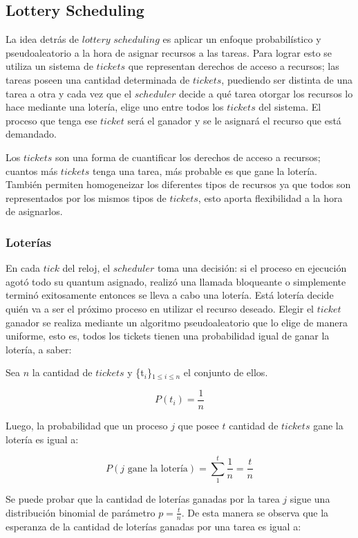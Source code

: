 \subsection{Lottery Scheduling}

La idea detr\'as de $lottery$ $scheduling$\cite{SchedLottery} es aplicar un enfoque probabil\'istico y pseudoaleatorio a la hora de asignar recursos a las tareas. Para lograr esto se utiliza un sistema de $tickets$ que representan derechos de acceso a recursos; las tareas poseen una cantidad determinada de $tickets$, puediendo ser distinta de una tarea a otra y cada vez que el $scheduler$ decide a qu\'e tarea otorgar los recursos lo hace mediante una loter\'ia, elige uno entre todos los $tickets$ del sistema. El proceso que tenga ese $ticket$ ser\'a el ganador y se le asignar\'a el recurso que est\'a demandado.

Los $tickets$ son una forma de cuantificar los derechos de acceso a recursos; cuantos m\'as $tickets$ tenga una tarea, m\'as probable es que gane la loter\'ia. Tambi\'en permiten homogeneizar los diferentes tipos de recursos ya que todos son representados por los mismos tipos de $tickets$, esto aporta flexibilidad a la hora de asignarlos.

\subsubsection{Loter\'ias}

En cada $tick$ del reloj, el $scheduler$ toma una decisi\'on: si el proceso en ejecuci\'on agot\'o todo su quantum asignado, realiz\'o una llamada bloqueante o simplemente termin\'o exitosamente entonces se lleva a cabo una loter\'ia. Est\'a loter\'ia decide qui\'en va a ser el pr\'oximo proceso en utilizar el recurso deseado. Elegir el $ticket$ ganador se realiza mediante un algoritmo pseudoaleatorio que lo elige de manera uniforme, esto es, todos los tickets tienen una probabilidad igual de ganar la loter\'ia, a saber:

Sea $n$ la cantidad de $tickets$ y \{t$_i$\}$_{1 \leq i \leq n}$ el conjunto de ellos.

\[
	P(t_{i}) = \frac{1}{n}
\]

Luego, la probabilidad que un proceso $j$ que posee $t$ cantidad de $tickets$ gane la loter\'ia es igual a:


\[
	P(j \text{ gane la loter\'ia}) = \sum_{1}^{t}\frac{1}{n} = \frac{t}{n}
\]

Se puede probar que la cantidad de loter\'ias ganadas por la tarea $j$ sigue una distribuci\'on binomial de par\'ametro $p = \frac{t}{n}$. De esta manera se observa que la esperanza de la cantidad de loter\'ias ganadas por una tarea es igual a:

